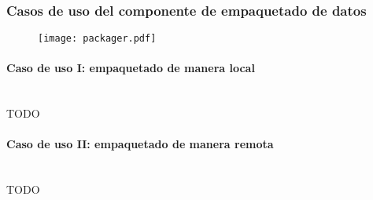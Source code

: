         \subsubsection{Casos de uso del componente de empaquetado de datos}
    
            \begin{figure}[h]
                \centering
                \texttt{[image: packager.pdf]}
                \label{fig:packager}
            \end{figure}
            
            \paragraph{Caso de uso I: empaquetado de manera local} \mbox{}\\
                TODO
                
            \paragraph{Caso de uso II: empaquetado de manera remota} \mbox{}\\
                TODO
        
